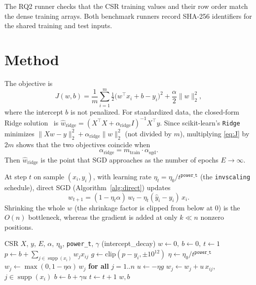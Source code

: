 \documentclass[10pt,a4paper,twocolumn]{article}
\newcommand{\supp}{\operatorname{supp}}
\begin{document}
The RQ2 runner checks that the CSR training values and their row order match the dense training arrays. Both benchmark runners record SHA-256 identifiers for the shared training and test inputs.

\section{Method}\label{sec:method}
The objective is
\begin{equation}
J(w,b)=\frac1m\sum_{i=1}^{m}\tfrac12\bigl(w^\top x_i+b-y_i\bigr)^2+\frac{\alpha}{2}\|w\|_2^2,
\label{eq:J}
\end{equation}
where the intercept $b$ is not penalized. For standardized data, the closed-form Ridge solution~\cite{hoerl} is $\hat w_{\mathrm{ridge}}=(X^\top X+\alpha_{\mathrm{ridge}}I)^{-1}X^\top y$. Since scikit-learn's \texttt{Ridge} minimizes $\|Xw-y\|_2^2+\alpha_{\mathrm{ridge}}\|w\|_2^2$ (not divided by $m$), multiplying \eqref{eq:J} by $2m$ shows that the two objectives coincide when
\begin{equation}
\alpha_{\mathrm{ridge}}=m_{\mathrm{train}}\cdot\alpha_{\mathrm{sgd}}.
\label{eq:alpha}
\end{equation}
Then $\hat w_{\mathrm{ridge}}$ is the point that SGD approaches as the number of epochs $E\to\infty$.

At step $t$ on sample $(x_i,y_i)$, with learning rate $\eta_t=\eta_0/t^{\texttt{power\_t}}$ (the \texttt{invscaling} schedule), direct SGD (Algorithm~\ref{alg:direct}) updates
\begin{equation}
w_{t+1}=(1-\eta_t\alpha)\,w_t-\eta_t(\hat y_i-y_i)\,x_i.
\label{eq:upd}
\end{equation}
Shrinking the whole $w$ (the shrinkage factor is clipped from below at 0) is the $O(n)$ bottleneck, whereas the gradient is added at only $k\ll n$ nonzero positions.

\begin{algorithm}[!htb]
\caption{Direct SGD}\label{alg:direct}
\small
\begin{algorithmic}[1]
\Require CSR $X$, $y$, $E$, $\alpha$, $\eta_0$, \texttt{power\_t}, $\gamma$ (intercept\_decay)
\State $w\gets 0,\ b\gets0,\ t\gets1$
  \State $p\gets b+\sum_{j\in\supp(x_i)}w_jx_{ij}$
  \State $g\gets\mathrm{clip}(p-y_i,\pm10^{12})$
  \State $\eta\gets\eta_0/t^{\texttt{power\_t}}$
  \State $w_j\gets\max(0,1-\eta\alpha)\,w_j$ \textbf{for all} $j=1..n$ 
  \State $u\gets-\eta g$
    \State $w_j\gets w_j+u\,x_{ij}$, $j\in\supp(x_i)$ 
    \State $b\gets b+\gamma u$
  \EndIf
  \State $t\gets t+1$
\EndFor
\State \Return $w,b$
\end{algorithmic}
\end{algorithm}
\end{document}
